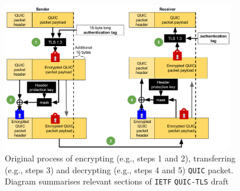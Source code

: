 \documentclass[12pt,a4paper]{report}
\begin{document}
    \begin{figure}[ht]
    \centering
    \includegraphics[width=0.9\textwidth]{figs/Cryptographic_procedures_of_quic.png}
    \caption[Original process of encrypting, transferring and decrypting \texttt{QUIC} packet]{Original process of encrypting (e.g., steps 1 and 2), transferring  (e.g., steps 3) and decrypting (e.g., steps 4 and 5) \texttt{QUIC} packet. Diagram summarises relevant sections of \texttt{IETF} \texttt{QUIC-TLS} draft~\cite[Section 5]{ietf-quic-tls-32}}
    \label{fig:Cryptographic_procedures_of_quic}
    \end{figure}
\end{document}
